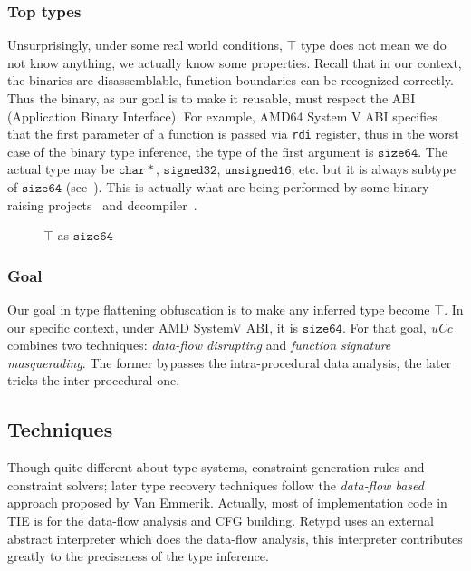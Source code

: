\documentclass[compsoc,conference,a4paper,10pt,times]{IEEEtran}
\begin{document}
\subsubsection*{Top types}
Unsurprisingly, under some real world conditions, $\top$ type does not mean we do not know anything,
we actually know some properties. Recall that in our context, the binaries are disassemblable, function boundaries can be
recognized correctly.
Thus the binary, as our goal is to make it reusable, must respect the ABI (Application
Binary Interface). For example, AMD64 System V ABI specifies that the first parameter of
a function is passed via \texttt{rdi} register, thus in the worst case of the binary type
inference, the type of the first argument is $\mathtt{size64}$. The actual type may be
$\mathtt{char*}$, $\mathtt{signed32}$, $\mathtt{unsigned16}$, etc. but it is always
subtype of $\mathtt{size64}$ (see~). This is actually what are being performed by some binary raising
projects~\cite{goodman_lifting_2018,yadavalli_raising_2019} and decompiler~\cite{durfina_detection_2012}.
\begin{figure}[h]
  \centering
  \caption{$\top$ as $\mathtt{size64}$}
  \label{fig:newtop}
\end{figure}

\subsubsection*{Goal}
Our goal in type flattening obfuscation is to make any inferred type become $\top$. In our specific
context, under AMD SystemV ABI, it is $\mathtt{size64}$. For that goal, \emph{uCc} combines two
techniques: \emph{data-flow disrupting} and \emph{function signature masquerading}. The former
bypasses the intra-procedural data analysis, the later tricks the inter-procedural one.

\subsection{Techniques}
\noindent
Though quite different about type systems, constraint generation rules and constraint solvers;
later type recovery techniques follow the \emph{data-flow based} approach proposed by Van Emmerik.
Actually, most of implementation code in TIE is for the data-flow analysis
and CFG building. Retypd uses an external abstract interpreter
which does the data-flow analysis, this interpreter contributes greatly to the
preciseness of the type inference.
\end{document}

